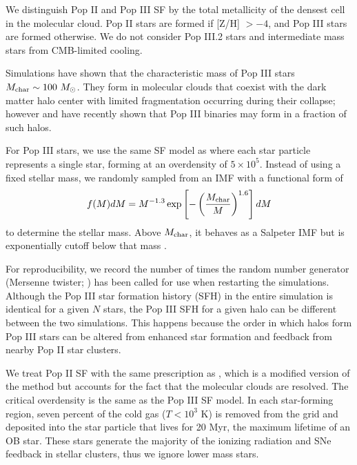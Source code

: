 \documentclass[12pt,preprint]{aastex}
\begin{document}
We distinguish Pop II and Pop III SF by the total metallicity of the
densest cell in the molecular cloud.  Pop II stars are formed if [Z/H]
$> -4$, and Pop III stars are formed otherwise.  We do not consider
Pop III.2 stars and intermediate mass stars from CMB-limited cooling.

Simulations have shown that the characteristic mass of Pop III stars
$M_{\rm char} \sim 100~\Ms$.  They form in molecular clouds that
coexist with the dark matter halo center with limited fragmentation
occurring during their collapse; however \citet{2009Sci...325..601T}
and \citet{Stacy10_Binary} have recently shown that Pop III binaries
may form in a fraction of such halos.


For Pop III stars, we use the same SF model as \citet{Wise08_Gal} where
each star particle represents a single star, forming at an overdensity
of $5 \times 10^5$.  Instead of using a fixed stellar mass, we randomly
sampled from an IMF with a functional form of
%
\begin{equation}
\label{eqn:imf}
f(M)dM = M^{-1.3} \exp\left[-\left(\frac{M_{\rm
        char}}{M}\right)^{1.6}\right] dM
\end{equation}
to determine the stellar mass.  Above $M_{\rm char}$, it behaves as a
Salpeter IMF but is exponentially cutoff below that mass
\citep{Chabrier03, Clark09}.

For reproducibility, we record the number of times the random number
generator (Mersenne twister; \citet{MTwister}) has been called for use
when restarting the simulations.  Although the Pop III star formation
history (SFH) in the entire simulation is identical for a given $N$
stars, the Pop III SFH for a given halo can be different between the
two simulations.  This happens because the order in which halos form
Pop III stars can be altered from enhanced star formation and feedback
from nearby Pop II star clusters.

We treat Pop II SF with the same prescription as \citet{Wise09}, which
is a modified version of the \citet{Cen92} method but accounts for the
fact that the molecular clouds are resolved.  The critical overdensity
is the same as the Pop III SF model.  In each star-forming region,
seven percent of the cold gas ($T < 10^3$ K) is removed from the grid
and deposited into the star particle that lives for 20 Myr, the
maximum lifetime of an OB star.  These stars generate the majority of
the ionizing radiation and SNe feedback in stellar clusters, thus we
ignore lower mass stars.
\end{document}
